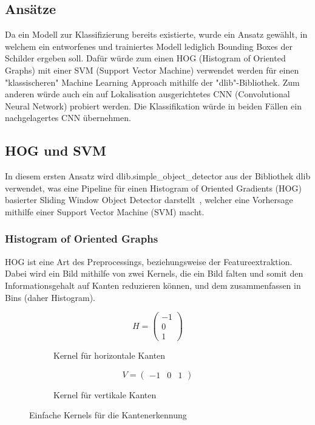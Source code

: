 \documentclass[runningheads]{llncs}
\begin{document}
\subsection{Ansätze}
Da ein Modell zur Klassifizierung bereits existierte, wurde ein Ansatz gewählt, in welchem ein entworfenes und trainiertes Modell lediglich Bounding Boxes der Schilder ergeben soll. Dafür würde zum einen HOG (Histogram of Oriented Graphs) mit einer SVM (Support Vector Machine) verwendet werden für einen "klassischeren" Machine Learning Approach mithilfe der "dlib"-Bibliothek. Zum anderen würde auch ein auf Lokalisation ausgerichtetes CNN (Convolutional Neural Network) probiert werden. Die Klassifikation würde in beiden Fällen ein nachgelagertes CNN übernehmen.

\subsection{HOG und SVM}
In diesem ersten Ansatz wird dlib.simple\_object\_detector aus der Bibliothek dlib verwendet, was eine Pipeline für einen Histogram of Oriented Gradients (HOG) basierter Sliding Window Object Detector darstellt~\cite{ref_dlib_docs}, welcher eine Vorhersage mithilfe einer Support Vector Machine (SVM) macht.

\subsubsection{Histogram of Oriented Graphs}
HOG ist eine Art des Preprocessings, beziehungsweise der Featureextraktion. Dabei wird ein Bild mithilfe von zwei Kernels, die ein Bild falten und somit den Informationsgehalt auf Kanten reduzieren können, und dem zusammenfassen in Bins (daher Histogram).

\begin{figure}[H]
    \centering
    \begin{subfigure}{0.45\textwidth}
        \centering
        \[
        H = \begin{pmatrix}
            -1 \\
            0 \\
            1
        \end{pmatrix}
        \]
        \caption{Kernel für horizontale Kanten}
        \label{figKernelsHorizontal}
    \end{subfigure}
    \hfill
    \begin{subfigure}{0.45\textwidth}
        \centering
        \[
        V = \begin{pmatrix}
            -1 & 0 & 1
        \end{pmatrix}
        \]
        \caption{Kernel für vertikale Kanten}
        \label{figKernelsVertical}
    \end{subfigure}
    \caption{Einfache Kernels für die Kantenerkennung}
    \label{figKernels}
\end{figure}
\end{document}
